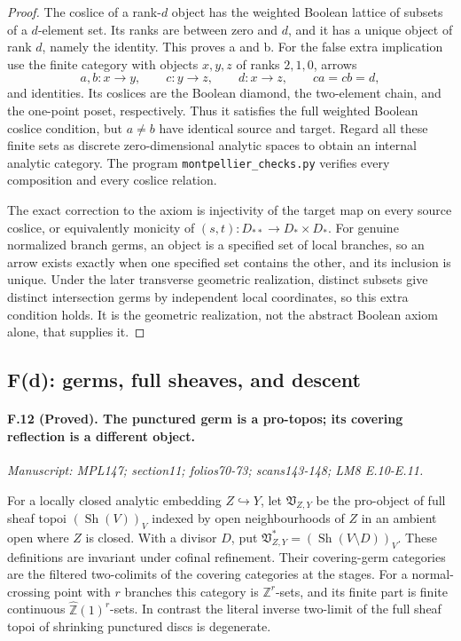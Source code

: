 \begin{proof}
The coslice of a rank-$d$ object has the weighted Boolean lattice of
subsets of a $d$-element set. Its ranks are between zero and $d$, and it
has a unique object of rank $d$, namely the identity. This proves a and b.
For the false extra implication use the finite category with objects
$x,y,z$ of ranks $2,1,0$, arrows
\[
 a,b:x\longrightarrow y,\qquad c:y\longrightarrow z,
 \qquad d:x\longrightarrow z,
 \qquad ca=cb=d,
\]
and identities. Its coslices are the Boolean diamond, the two-element
chain, and the one-point poset, respectively. Thus it satisfies the full
weighted Boolean coslice condition, but $a\ne b$ have identical source
and target. Regard all these finite sets as discrete zero-dimensional
analytic spaces to obtain an internal analytic category. The program
\texttt{montpellier\_checks.py} verifies every composition and every
coslice relation.

The exact correction to the axiom is injectivity of the target map on
every source coslice, or equivalently monicity of
$(s,t):D_{**}\to D_*\times D_*$. For genuine normalized branch germs, an
object is a specified set of local branches, so an arrow exists exactly
when one specified set contains the other, and its inclusion is unique.
Under the later transverse geometric realization, distinct subsets give
distinct intersection germs by independent local coordinates, so this
extra condition holds. It is the geometric realization, not the
abstract Boolean axiom alone, that supplies it.
\end{proof}

\subsection{F(d): germs, full sheaves, and descent}

\paragraph{F.12 (Proved). The punctured germ is a pro-topos; its covering
reflection is a different object.}
\textit{Manuscript: MPL147; section11; folios70-73; scans143-148; LM8 E.10-E.11.}

For a locally closed analytic embedding $Z\hookrightarrow Y$, let
$\mathfrak V_{Z,Y}$ be the pro-object of full sheaf topoi
$(\operatorname{Sh}(V))_V$ indexed by open neighbourhoods of $Z$ in an
ambient open where $Z$ is closed. With a divisor $D$, put
$\mathfrak V^*_{Z,Y}=(\operatorname{Sh}(V\setminus D))_V$.
These definitions are invariant under cofinal refinement. Their
covering-germ categories are the filtered two-colimits of the covering
categories at the stages. For a normal-crossing point with $r$ branches
this category is $\mathbb Z^r$-sets, and its finite part is finite
continuous $\widehat{\mathbb Z}(1)^r$-sets. In contrast the literal
inverse two-limit of the full sheaf topoi of shrinking punctured discs
is degenerate.

